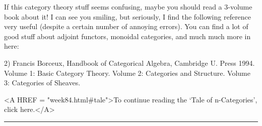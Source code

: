 If this category theory stuff seems confusing, maybe you should read a
3-volume book about it!  I can see you smiling, but seriously, I find
the following reference very useful (despite a certain number of
annoying errors).  You can find a lot of good stuff about adjoint
functors, monoidal categories, and much much more in here:

2) Francis Borceux, Handbook of Categorical Algebra, Cambridge U. Press
1994.  Volume 1: Basic Category Theory.  Volume 2: Categories and
Structure.  Volume 3: Categories of Sheaves.  




<A HREF = "week84.html#tale">To continue reading the `Tale of
n-Categories', click here.</A>



\par\noindent\rule{\textwidth}{0.4pt}



